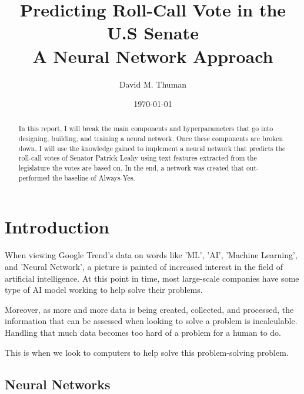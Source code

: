 \documentclass[%
 reprint,
 amsmath,amssymb,
 aps,
]{revtex4-2}
\begin{document}

\title{Predicting Roll-Call Vote in the U.S Senate \\ A Neural Network Approach}%

\author{David M. Thuman}

\date{\today}%

\begin{abstract}
In this report, I will break the main components and hyperparameters that go into designing, building, and training a neural network. Once these components are broken down, I will use the knowledge gained to implement a neural network that predicts the roll-call votes of Senator Patrick Leahy using text features extracted from the legislature the votes are based on. In the end, a network was created that out-performed the baseline of Always-Yes.
\end{abstract}

\maketitle


\section{Introduction}

When viewing Google Trend's data on words like 'ML', 'AI', 'Machine Learning', and 'Neural Network', a picture is painted of increased interest in the field of artificial intelligence. At this point in time, most large-scale companies have some type of AI model working to help solve their problems.

Moreover, as more and more data is being created, collected, and processed, the information that can be assessed when looking to solve a problem is incalculable. Handling that much data becomes too hard of a problem for a human to do.

This is when we look to computers to help solve this problem-solving problem.

\subsection{Neural Networks}
\end{document}
